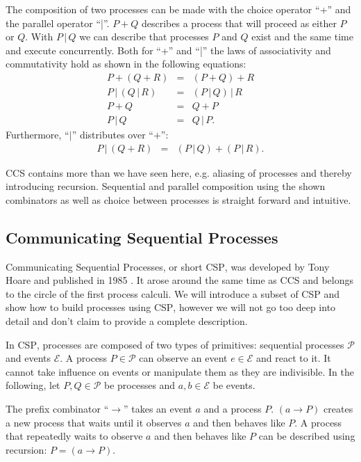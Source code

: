 The composition of two processes can be made with the choice operator \enquote{+} and the parallel operator \enquote{|}. $P + Q$ describes a process that will proceed as either $P$ or $Q$. With $P \,|\, Q$ we can describe that processes $P$ and $Q$ exist and the same time and execute concurrently. Both for \enquote{+} and \enquote{|} the laws of associativity and commutativity hold as shown in the following equations:
\begin{eqnarray*}
  P + \left( Q + R \right) & = & \left( P + Q \right) + R \\
  P \,|\, \left( Q \,|\, R \right) & = & \left( P \,|\, Q \right) \,|\, R \\
  P + Q & = & Q + P \\
  P \,|\, Q & = & Q \,|\, P.
\end{eqnarray*}
Furthermore, \enquote{$|$} distributes over \enquote{$+$}:
\begin{eqnarray*}
  P \,|\, \left( Q + R \right) & = & \left( P \,|\, Q \right) + \left( P \,|\, R \right).
\end{eqnarray*}

\textsc{CCS} contains more than we have seen here, e.g. aliasing of processes and thereby introducing recursion. Sequential and parallel composition using the shown combinators as well as choice between processes is straight forward and intuitive.

\subsection{Communicating Sequential Processes}
Communicating Sequential Processes, or short \textsc{CSP}, was developed by Tony Hoare and published in 1985 \cite{Hoare:1985:CSP:3921}. It arose around the same time as \textsc{CCS} and belongs to the circle of the first process calculi. We will introduce a subset of \textsc{CSP} and show how to build processes using \textsc{CSP}, however we will not go too deep into detail and don't claim to provide a complete description.

In \textsc{CSP}, processes are composed of two types of primitives: sequential processes $\mathcal{P}$ and events $\mathcal{E}$. A process $P \in \mathcal{P}$ can observe an event $e \in \mathcal{E}$ and react to it. It cannot take influence on events or manipulate them as they are indivisible. In the following, let $P, Q \in \mathcal{P}$ be processes and $a,b \in \mathcal{E}$ be events.

The prefix combinator \enquote{$\to$} takes an event $a$ and a process $P$. $\left( a \to P \right)$ creates a new process that waits until it observes $a$ and then behaves like $P$. A process that repeatedly waits to observe $a$ and then behaves like $P$ can be described using recursion: $P = \left( a \to P \right)$.

